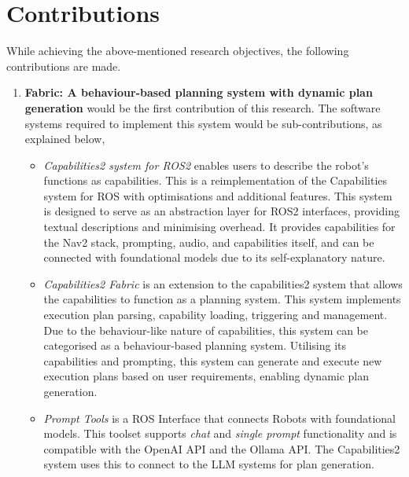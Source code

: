\section{Contributions}
\label{sec::ResearchContributions}

While achieving the above-mentioned research objectives, the following contributions are made.

\begin{enumerate}
    \item \textbf{Fabric: A behaviour-based planning system with dynamic plan generation} would be the first contribution of this research. The software systems required to implement this system would be sub-contributions, as explained below,
    
    \begin{itemize}
    
        \item \textit{Capabilities2 system for ROS2} enables users to describe the robot's functions as capabilities. This is a reimplementation of the Capabilities system \cite{woodall2014ros} for ROS with optimisations and additional features. This system is designed to serve as an abstraction layer for ROS2 interfaces, providing textual descriptions and minimising overhead. It provides capabilities for the Nav2 stack, prompting, audio, and capabilities itself, and can be connected with foundational models due to its self-explanatory nature.
        
        \item \textit{Capabilities2 Fabric} is an extension to the capabilities2 system that allows the capabilities to function as a planning system. This system implements execution plan parsing, capability loading, triggering and management. Due to the behaviour-like nature of capabilities, this system can be categorised as a behaviour-based planning system. Utilising its capabilities and prompting, this system can generate and execute new execution plans based on user requirements, enabling dynamic plan generation.
        
        \item \textit{Prompt Tools} is a ROS Interface that connects Robots with foundational models. This toolset supports \textit{chat} and \textit{single prompt} functionality and is compatible with the OpenAI API and the Ollama API. The Capabilities2 system uses this to connect to the LLM systems for plan generation. 
        
    \end{itemize}


\end{enumerate}
